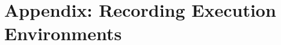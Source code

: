 \documentclass[a4paper,11pt]{article}
\begin{document}


\renewcommand*{\bibfont}{\small}
\printbibliography[title=References]

\newpage 
\appendix
\section{Appendix: Recording Execution Environments}
\label{appendix:executionenvs}

\end{document}
